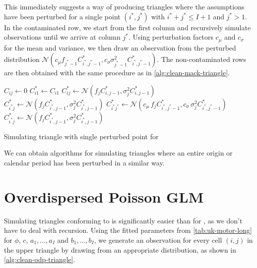 \documentclass[a4paper]{book}
\begin{document}
\restoregeometry

This immediately suggests a way of producing triangles where the assumptions have been perturbed for a single point $(i^*, j^*)$ with $i^* + j^* \leq I + 1$ and $j^* > 1$. In the contaminated row, we start from the first column and recursively simulate observations until we arrive at column $j^*$. Using perturbation factors $c_\mu$ and $c_\sigma$ for the mean and variance, we then draw an observation from the perturbed distribution $\mathcal{N}(c_\mu f_{j^* - 1} C^*_{i^*, j^* - 1}, c_\sigma \sigma^2_{j^* - 1} C^*_{i^*, j^* - 1})$. The non-contaminated rows are then obtained with the same procedure as in \cref{alg:clean-mack-triangle}.

\begin{algorithm}[!htb]
  \begin{algorithmic}
      \State $C_{ij} \gets 0$
    \EndFor
      \State $C^*_{i1} \gets C_{i1}$
          \State $C^*_{ij} \gets \mathcal{N}(f_j C^*_{i, j - 1}, \sigma_j^2 C^*_{i, j - 1})$
        \EndFor
      \Else
          \State $C^*_{i^*j} \gets \mathcal{N}(f_j C^*_{i^*, j - 1}, \sigma_j^2 C^*_{i^*, j - 1})$
        \EndFor
        \State $C^*_{i^*j^*} \gets \mathcal{N}(c_\mu \, f_j C^*_{i^*, j^* - 1}, c_\sigma \, \sigma_j^2 C^*_{i^*, j^* - 1})$
          \State $C^*_{i^*j} \gets \mathcal{N}(f_j C^*_{i^*, j - 1}, \sigma_j^2 C^*_{i^*, j - 1})$
        \EndFor
      \EndIf
    \EndFor
    \State {}
  \end{algorithmic}
  \caption{Simulating triangle with single perturbed point for }
\end{algorithm}

We can obtain algorithms for simulating triangles where an entire origin or calendar period has been perturbed in a similar way.

\section{Overdispersed Poisson GLM}

Simulating triangles conforming to  is significantly easier than for , as we don't have to deal with recursion. Using the fitted parameters from \cref{tab:uk-motor-long} for $\phi$, $c$, $a_1, \dots, a_I$ and $b_1, \dots, b_I$, we generate an observation for every cell $(i, j)$ in the upper triangle by drawing from an appropriate distribution, as shown in \cref{alg:clean-odp-triangle}.
\end{document}
